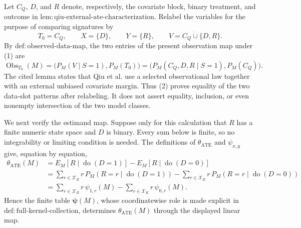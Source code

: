 Let \(C_Q\), \(D\), and \(R\) denote, respectively, the covariate block, binary treatment, and outcome in \(\mathrm{lem{:}qiu\text{-}external\text{-}ate\text{-}characterization}\). Relabel the variables for the purpose of comparing signatures by
\[
T_0=C_Q,\qquad X=\{D\},\qquad Y=\{R\},\qquad
V=C_Q\mathbin{\dot\cup}\{D,R\}.
\tag{1}
\]
By \(\mathrm{def{:}observed\text{-}data\text{-}map}\), the two entries of the present observation map under (1) are
\[
\operatorname{Obs}_{T_0}(M)
=\bigl(P_M(V\mid S=1),P_M(T_0)\bigr)
=\bigl(P_M(C_Q,D,R\mid S=1),P_M(C_Q)\bigr).
\tag{2}
\]
The cited lemma states that Qiu et al. use a selected observational law together with an external unbiased covariate margin. Thus (2) proves equality of the two data-slot patterns after relabeling. It does not assert equality, inclusion, or even nonempty intersection of the two model classes.

We next verify the estimand map. Suppose only for this calculation that \(R\) has a finite numeric state space and \(D\) is binary. Every sum below is finite, so no integrability or limiting condition is needed. The definitions of \(\theta_{\mathrm{ATE}}\) and \(\psi_{x,y}\) give, equation by equation,
\[
\begin{aligned}
\theta_{\mathrm{ATE}}(M)
&=E_M[R\mid\operatorname{do}(D=1)]
  -E_M[R\mid\operatorname{do}(D=0)]\\
&=\sum_{r\in\mathcal X_R}r\,
  P_M(R=r\mid\operatorname{do}(D=1))
  -\sum_{r\in\mathcal X_R}r\,
  P_M(R=r\mid\operatorname{do}(D=0))\\
&=\sum_{r\in\mathcal X_R}r\,\psi_{1,r}(M)
  -\sum_{r\in\mathcal X_R}r\,\psi_{0,r}(M).
\end{aligned}
\tag{3}
\]
Hence the finite table \(\boldsymbol\psi(M)\), whose coordinatewise role is made explicit in \(\mathrm{def{:}full\text{-}kernel\text{-}collection}\), determines \(\theta_{\mathrm{ATE}}(M)\) through the displayed linear map.

